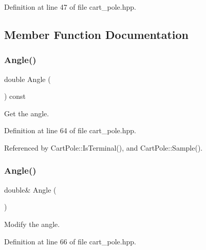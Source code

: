 Definition at line 47 of file cart\+\_\+pole.\+hpp.



\subsection{Member Function Documentation}
\mbox{\label{classmlpack_1_1rl_1_1CartPole_1_1State_af48d93c5d69b4024665b3e4af6fa52ff}} 
\subsubsection{Angle()\hspace{0.1cm}{\footnotesize\ttfamily [1/2]}}
{\footnotesize\ttfamily double Angle (\begin{DoxyParamCaption}{ }\end{DoxyParamCaption}) const\hspace{0.3cm}{\ttfamily [inline]}}



Get the angle. 



Definition at line 64 of file cart\+\_\+pole.\+hpp.



Referenced by Cart\+Pole\+::\+Is\+Terminal(), and Cart\+Pole\+::\+Sample().

\mbox{\label{classmlpack_1_1rl_1_1CartPole_1_1State_ab5ad4d288bdca197d1a6562a2aa0afd3}} 
\subsubsection{Angle()\hspace{0.1cm}{\footnotesize\ttfamily [2/2]}}
{\footnotesize\ttfamily double\& Angle (\begin{DoxyParamCaption}{ }\end{DoxyParamCaption})\hspace{0.3cm}{\ttfamily [inline]}}



Modify the angle. 



Definition at line 66 of file cart\+\_\+pole.\+hpp.

